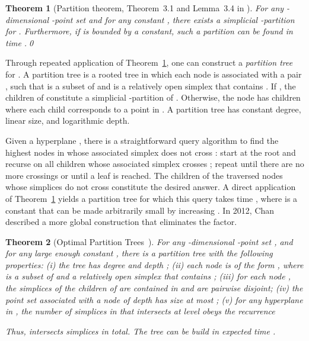 \documentclass[a4paper,11pt]{paper}
\newtheorem{theorem} {Theorem}[section]
\begin{document}
\begin{theorem}[Partition theorem, Theorem~3.1 and Lemma~3.4
  in \cite{Matousek92}]\label{thm:partition}
  For any -dimensional -point set  and for
  any constant , there exists a simplicial
  -partition for . Furthermore, if  is bounded by
  a constant, such a partition can be found in time .\qed
\end{theorem}

Through repeated application of Theorem~\ref{thm:partition},
one can construct a \emph{partition tree} for .
A partition tree  is a rooted tree in which each node
is associated with a pair , such that  is a subset
of  and  is a relatively open simplex that
contains . If , the children of 
constitute a simplicial -partition of . Otherwise,
the node  has  children where each child
corresponds to a point in . A partition tree has
constant degree, linear size, and logarithmic depth.

Given a hyperplane , there is a straightforward query
algorithm to find the highest nodes in  whose
associated simplex does not cross : start at the root and
recurse on all children whose associated simplex crosses ;
repeat until there are no more crossings or until a leaf is reached.
The children of the traversed nodes whose simplices do not cross
 constitute the desired answer. A direct application of
Theorem~\ref{thm:partition} yields a partition tree for which this
query takes time , where  is
a constant that can be made arbitrarily small by increasing .
In 2012, Chan~\cite{Chan12} described a more global
construction that eliminates the  factor.

\begin{theorem}[Optimal Partition
   Trees~\cite{Chan12}]\label{thm:optpartition}
  For any -dimensional -point set ,
  and for any large enough constant ,
  there is a \emph{partition tree}  with the following
  properties:
   (i) the tree  has degree  and depth ;
    (ii) each node is of the form ,
     where  is a subset of  and  a relatively open
     simplex that contains ; (iii) for each node ,
     the simplices of the children of  are contained in 
     and are pairwise disjoint; (iv) the point set associated
     with a node of depth  has size at most ;
     (v) for any hyperplane  in , the number
      of simplices in   that
      intersects at level  obeys the recurrence
     
   Thus,  intersects  simplices in total.
 The tree  can be build in expected time .
\end{theorem}
\end{document}
